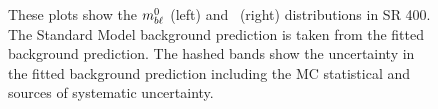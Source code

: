 \begin{figure}[p]
  \centering
  \caption{These plots show the $m_{b\ell}^0$ (left) and \HT\ (right) distributions
    in SR 400.
    The Standard Model background prediction is taken from the fitted
    background prediction.
    The hashed bands show the uncertainty in the fitted background prediction
    including the MC statistical and sources of systematic uncertainty.
  }
  \label{fig:sr_dists}
\end{figure}

